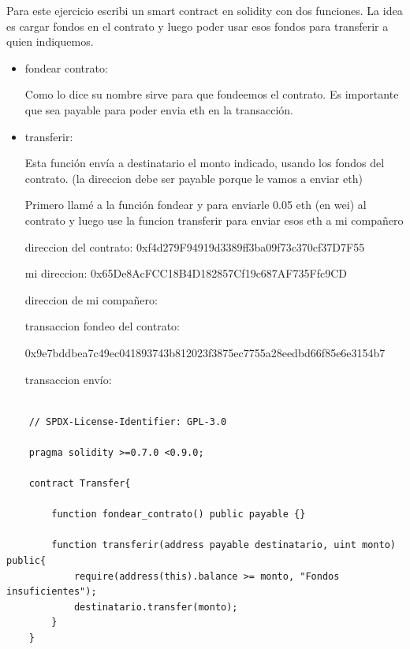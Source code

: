 \documentclass[12pt,addpoints,answers]{exam}
\begin{document}
\begin{questions}
\begin{solution}
    Para este ejercicio escribi un smart contract en solidity con dos funciones. La idea es cargar fondos
    en el contrato y luego poder usar esos fondos para transferir a quien indiquemos.

    \begin{itemize}
        \item fondear contrato: 
        
        Como lo dice su nombre sirve para que fondeemos el contrato.
        Es importante que sea payable para poder envia eth en la transacción.
        \item transferir: 
        
        Esta función envía a 
        destinatario el monto indicado, usando los fondos del contrato. (la direccion debe ser payable porque le
        vamos a enviar eth)


        Primero llamé a la función fondear y para enviarle 0.05 eth (en wei) al contrato y luego use
        la funcion transferir para enviar esos eth a mi compañero

        direccion del contrato: 0xf4d279F94919d3389ff3ba09f73c370cf37D7F55

        mi direccion: 0x65De8AcFCC18B4D182857Cf19c687AF735Ffc9CD
        
        direccion de mi compañero: 
        
        transaccion fondeo del contrato: 
        
        0x9e7bddbea7c49ec041893743b812023f3875ec7755a28eedbd66f85e6e3154b7
        
        transaccion envío: 


    \end{itemize}
    
\end{solution}
\begin{verbatim}

    // SPDX-License-Identifier: GPL-3.0

    pragma solidity >=0.7.0 <0.9.0;

    contract Transfer{
        
        function fondear_contrato() public payable {} 

        function transferir(address payable destinatario, uint monto) public{
            require(address(this).balance >= monto, "Fondos insuficientes");
            destinatario.transfer(monto);
        }
    }

\end{verbatim}


\end{questions}
\end{document}
